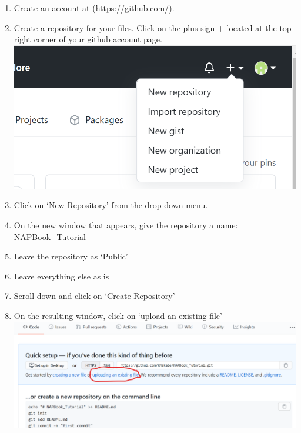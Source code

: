 \documentclass[
]{book}
\providecommand{\tightlist}{%
  \setlength{\itemsep}{0pt}\setlength{\parskip}{0pt}}
\begin{document}
\begin{enumerate}
\def\labelenumi{\arabic{enumi}.}
\tightlist
\item
  Create an account at (\url{https://github.com/}).
\item
  Create a repository for your files. Click on the plus sign + located at the top right corner of your github account page.
  \includegraphics{tutorial_screenshots/gh_create_repo.png}
\item
  Click on `New Repository' from the drop-down menu.\\
\item
  On the new window that appears, give the repository a name: NAPBook\_Tutorial\\
\item
  Leave the repository as `Public'
\item
  Leave everything else as is\\
\item
  Scroll down and click on `Create Repository'\\
\item
  On the resulting window, click on `upload an existing file'\\
  \includegraphics{tutorial_screenshots/gh_uploadfiles.png}
\end{enumerate}
\end{document}

